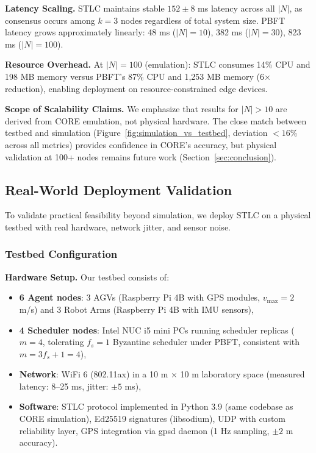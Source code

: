 \documentclass[manuscript,screen,review]{acmart}
\begin{document}
\textbf{Latency Scaling.} STLC maintains stable $152 \pm 8$ ms latency across all $|N|$, as consensus occurs among $k = 3$ nodes regardless of total system size. PBFT latency grows approximately linearly: 48 ms ($|N|=10$), 382 ms ($|N|=30$), 823 ms ($|N|=100$).

\textbf{Resource Overhead.} At $|N| = 100$ (emulation): STLC consumes 14\% CPU and 198 MB memory versus PBFT's 87\% CPU and 1,253 MB memory (6$\times$ reduction), enabling deployment on resource-constrained edge devices.

\textbf{Scope of Scalability Claims.} We emphasize that results for $|N| > 10$ are derived from CORE emulation, not physical hardware. The close match between testbed and simulation (Figure~\ref{fig:simulation_vs_testbed}, deviation $< 16\%$ across all metrics) provides confidence in CORE's accuracy, but physical validation at 100+ nodes remains future work (Section~\ref{sec:conclusion}).

\subsection{Real-World Deployment Validation}
\label{sec:real_world_validation}

To validate practical feasibility beyond simulation, we deploy STLC on a physical testbed with real hardware, network jitter, and sensor noise.

\subsubsection{Testbed Configuration}
\label{sec:testbed_config}

\textbf{Hardware Setup.} Our testbed consists of:
\begin{itemize}
    \item \textbf{6 Agent nodes}: 3 AGVs (Raspberry Pi 4B with GPS modules, $v_{\max} = 2$ m/s) and 3 Robot Arms (Raspberry Pi 4B with IMU sensors),
    \item \textbf{4 Scheduler nodes}: Intel NUC i5 mini PCs running scheduler replicas ($m = 4$, tolerating $f_s = 1$ Byzantine scheduler under PBFT, consistent with $m = 3f_s + 1 = 4$),
    \item \textbf{Network}: WiFi 6 (802.11ax) in a 10 m $\times$ 10 m laboratory space (measured latency: 8--25 ms, jitter: $\pm 5$ ms),
    \item \textbf{Software}: STLC protocol implemented in Python 3.9 (same codebase as CORE simulation), Ed25519 signatures (libsodium), UDP with custom reliability layer, GPS integration via gpsd daemon (1 Hz sampling, $\pm 2$ m accuracy).
\end{itemize}
\end{document}
